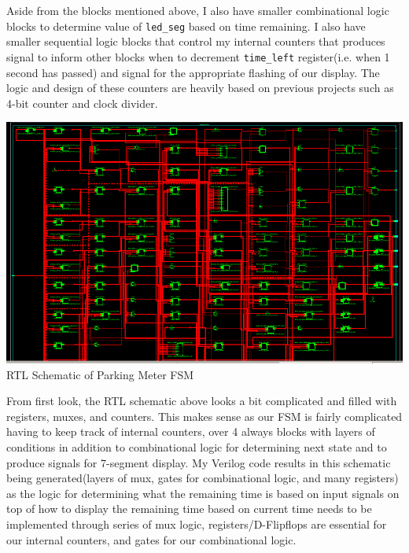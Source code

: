 \documentclass{article}
\begin{document}
Aside from the blocks mentioned above, I also have smaller combinational logic blocks to determine value of \texttt{led\_seg} based on time remaining. I also have smaller sequential logic blocks that control my internal counters that produces signal to inform other blocks when to decrement \texttt{time\_left} register(i.e. when 1 second has passed) and signal for the appropriate flashing of our display. The logic and design of these counters are heavily based on previous projects such as 4-bit counter and clock divider.
\begin{center}
    \includegraphics[scale=0.4]{rtl-lab5.png} \\
    \caption{RTL Schematic of Parking Meter FSM}
\end{center} 
From first look, the RTL schematic above looks a bit complicated and filled with registers, muxes, and counters. This makes sense as our FSM is fairly complicated having to keep track of internal counters, over 4 always blocks with layers of conditions in addition to combinational logic for determining next state and to produce signals for 7-segment display. My Verilog code results in this schematic being generated(layers of mux, gates for combinational logic, and many registers) as the logic for determining what the remaining time is based on input signals on top of how to display the remaining time based on current time needs to be implemented through series of mux logic, registers/D-Flipflops are essential for our internal counters, and gates for our combinational logic.
\end{document}
